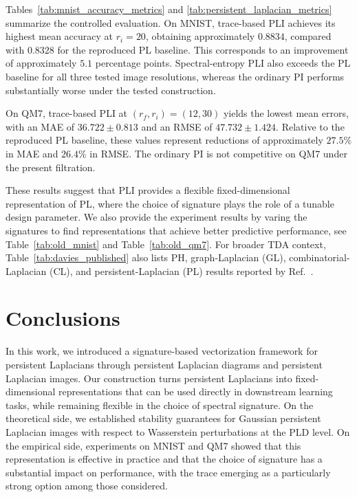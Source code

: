 \documentclass{article}
\begin{document}
Tables~\ref{tab:mnist_accuracy_metrics} and
\ref{tab:persistent_laplacian_metrics} summarize the controlled
evaluation. On MNIST, trace-based PLI achieves its highest mean
accuracy at \(r_i=20\), obtaining approximately \(0.8834\), compared with \(0.8328\) for the reproduced PL baseline. This
corresponds to an improvement of approximately \(5.1\) percentage
points. Spectral-entropy PLI also exceeds the PL baseline for all
three tested image resolutions, whereas the ordinary PI performs
substantially worse under the tested construction.

On QM7, trace-based PLI at \((r_f,r_i)=(12,30)\) yields the lowest
mean errors, with an MAE of \(36.722\pm0.813\) and an RMSE of
\(47.732\pm1.424\). Relative to the reproduced PL baseline, these
values represent reductions of approximately \(27.5\%\) in MAE and
\(26.4\%\) in RMSE. The ordinary PI is not competitive on QM7 under the present filtration.

These results suggest that PLI provides a flexible fixed-dimensional representation of PL, where the choice of signature plays the role of a tunable design parameter. We also provide the experiment results by varing the signatures to find representations that achieve better predictive performance, see Table~\ref{tab:old_mnist} and Table~\ref{tab:old_qm7}. For broader TDA context, Table~\ref{tab:davies_published} also lists PH, graph-Laplacian (GL), combinatorial-Laplacian (CL), and persistent-Laplacian (PL) results reported by Ref.~\cite{davies2023persistent}.

\section{Conclusions}
\label{sec:conclusions}


In this work, we introduced a signature-based vectorization framework for persistent Laplacians through persistent Laplacian diagrams and persistent Laplacian images. Our construction turns persistent Laplacians into fixed-dimensional representations that can be used directly in downstream learning tasks, while remaining flexible in the choice of spectral signature. On the theoretical side, we established stability guarantees for Gaussian persistent Laplacian images with respect to Wasserstein perturbations at the PLD level. On the empirical side, experiments on MNIST and QM7 showed that this representation is effective in practice and that the choice of signature has a substantial impact on performance, with the trace emerging as a particularly strong option among those considered.
\end{document}
